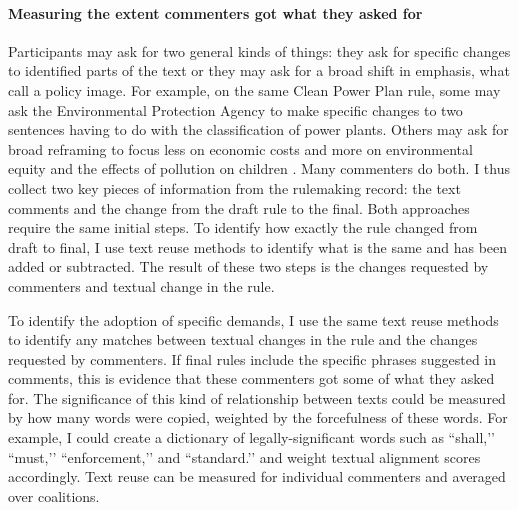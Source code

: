 \paragraph{Measuring the extent commenters got what they asked for}

Participants may ask for two general kinds of things: they ask for specific changes to identified parts of the text or they may ask for a broad shift in emphasis, what \citet{Jones2005} call a policy image. For example, on the same Clean Power Plan rule, some may ask the Environmental Protection Agency to make specific changes to two sentences having to do with the classification of power plants.%
Others may ask for broad reframing to focus less on economic costs and more on environmental equity and the effects of pollution on children \citep{Rinfret2011}. Many commenters do both. 
I thus collect two key pieces of information from the rulemaking record: the text comments and the change from the draft rule to the final. %
Both approaches require the same initial steps. To identify how exactly the rule changed from draft to final, I use text reuse methods to identify what is the same and has been added or subtracted. 
The result of these two steps is the changes requested by commenters and textual change in the rule. 

To identify the adoption of specific demands, I use the same text reuse methods to identify any matches between textual changes in the rule and the changes requested by commenters. If final rules include the specific phrases suggested in comments, this is evidence that these commenters got some of what they asked for. The significance of this kind of relationship between texts could be measured by how many words were copied, weighted by the forcefulness of these words. For example, I could create a dictionary of legally-significant words such as ``shall,’’ ``must,’’ ``enforcement,’’ and ``standard.’’ and weight textual alignment scores accordingly. Text reuse can be measured for individual commenters and averaged over coalitions. 

